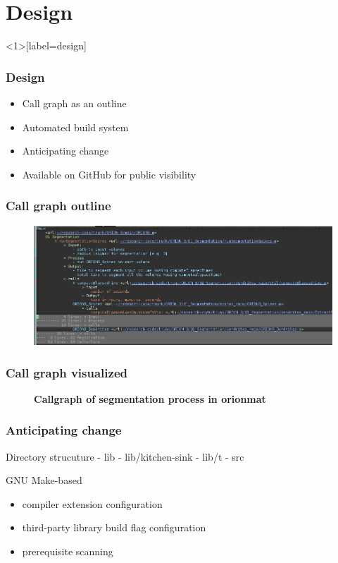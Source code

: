 \section{Design}

\begin{frame}<1>[label=design]\frametitle{Design}
\begin{itemize}
	\item<1> Call graph as an outline
	\item<2> Automated build system
	\item<3> Anticipating change
	\item<3> Available on GitHub for public visibility
\end{itemize}
\end{frame}

\begin{frame}\frametitle{Call graph outline}
\begin{figure}
\centering
\includegraphics[width=1.0\textwidth]{gfx/call-graph-outline}
\end{figure}
\end{frame}

\begin{frame}\frametitle{Call graph visualized}
\begin{figure}
\centering
\resizebox{0.8\textwidth}{!}{}
\caption[Callgraph of segmentation process in ]{
\textbf{\boldmath{} Callgraph of segmentation process in \gls{orionmat}}
}\label{fig:orionmat-segmentation}
\end{figure}
\end{frame}



\begin{frame}\frametitle{Anticipating change}
	Directory strucuture
- lib
- lib/kitchen-sink
- lib/t
- src
\end{frame}

\begin{frame}
	GNU Make-based 
	\begin{itemize}
		\item compiler extension configuration
		\item third-party library build flag configuration
		\item prerequisite scanning
	\end{itemize}
\end{frame}


